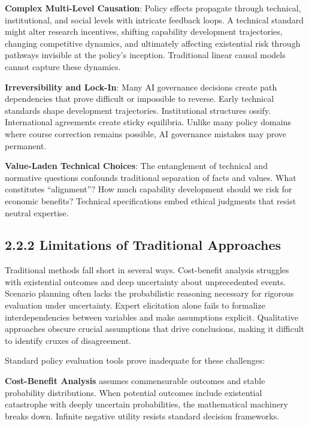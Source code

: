 \documentclass[
  11pt,
  letterpaper,
]{book}
\begin{document}
\textbf{Complex Multi-Level Causation}: Policy effects propagate through
technical, institutional, and social levels with intricate feedback
loops. A technical standard might alter research incentives, shifting
capability development trajectories, changing competitive dynamics, and
ultimately affecting existential risk through pathways invisible at the
policy's inception. Traditional linear causal models cannot capture
these dynamics.

\textbf{Irreversibility and Lock-In}: Many AI governance decisions
create path dependencies that prove difficult or impossible to reverse.
Early technical standards shape development trajectories. Institutional
structures ossify. International agreements create sticky equilibria.
Unlike many policy domains where course correction remains possible, AI
governance mistakes may prove permanent.

\textbf{Value-Laden Technical Choices}: The entanglement of technical
and normative questions confounds traditional separation of facts and
values. What constitutes ``alignment''? How much capability development
should we risk for economic benefits? Technical specifications embed
ethical judgments that resist neutral expertise.

\subsection*{2.2.2 Limitations of Traditional
Approaches}\label{sec-traditional-limitations}

Traditional methods fall short in several ways. Cost-benefit analysis
struggles with existential outcomes and deep uncertainty about
unprecedented events. Scenario planning often lacks the probabilistic
reasoning necessary for rigorous evaluation under uncertainty. Expert
elicitation alone fails to formalize interdependencies between variables
and make assumptions explicit. Qualitative approaches obscure crucial
assumptions that drive conclusions, making it difficult to identify
cruxes of disagreement.

Standard policy evaluation tools prove inadequate for these challenges:

\textbf{Cost-Benefit Analysis} assumes commensurable outcomes and stable
probability distributions. When potential outcomes include existential
catastrophe with deeply uncertain probabilities, the mathematical
machinery breaks down. Infinite negative utility resists standard
decision frameworks.
\end{document}
